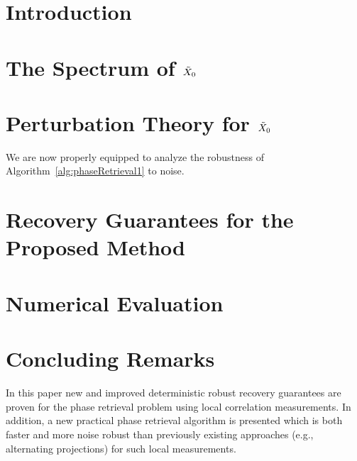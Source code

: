 \label{ch:base_model}

\setcounter{MaxMatrixCols}{20}

\def\SmallColSep{\setlength{\arraycolsep}{0.8\arraycolsep}}


\section{Introduction}
\label{sec:intro}


\section{The Spectrum of $\tilde{X}_0$}
\label{sec:Spectrum}


\section{Perturbation Theory for $\tilde{X}_0$}
\label{sec:Perturb}


We are now properly equipped to analyze the robustness of Algorithm~\ref{alg:phaseRetrieval1} to noise.

\section{Recovery Guarantees for the Proposed Method}
\label{sec:RecovGuarantee}
\label{sec:recov_guar}


\section{Numerical Evaluation}
\label{sec:NumEval}


\section{Concluding Remarks}
\label{sec:conclusion}

In this paper new and improved deterministic robust recovery guarantees are proven for the phase retrieval problem using local correlation measurements.  In addition, a new practical phase retrieval algorithm is presented which is both faster and more noise robust than previously existing approaches (e.g., alternating projections) for such local measurements.  


